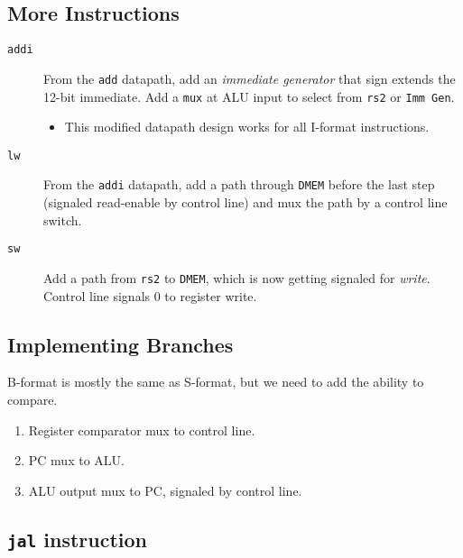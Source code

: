 \subsection{More Instructions}
\begin{description}
\item [\texttt{addi}]
From the \texttt{add} datapath, add an \emph{immediate generator} that sign extends the 12-bit immediate. Add a \texttt{mux} at ALU input to select from \texttt{rs2} or \texttt{Imm Gen}.
\begin{itemize}
    \item This modified datapath design works for all I-format instructions.
\end{itemize}

\item[\texttt{lw}]
From the \texttt{addi} datapath, add a path through \texttt{DMEM} before the last step (signaled read-enable by control line) and mux the path by a control line switch.

\item[\texttt{sw}]
Add a path from \texttt{rs2} to \texttt{DMEM}, which is now getting signaled for \emph{write}. Control line signals 0 to register write.
\end{description}

\subsection{Implementing Branches}
B-format is mostly the same as S-format, but we need to add the ability to compare.
\begin{enumerate}
	\item Register comparator mux to control line.
	\item PC mux to ALU.
	\item ALU output mux to PC, signaled by control line.
\end{enumerate}

\subsection{\texttt{jal} instruction}
